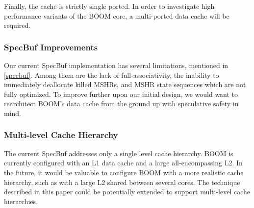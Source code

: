 Finally, the cache is strictly single ported. In order to investigate high performance variants
of the BOOM core, a multi-ported data cache will be required.

\subsubsection{SpecBuf Improvements}
Our current SpecBuf implementation has several limitations, mentioned in \ref{specbuf}.
Among them are the lack of full-associativity, the inability to immediately deallocate killed MSHRs,
and MSHR state sequences which are not fully optimized.
To improve further upon our initial design, we would want to rearchitect BOOM's data cache from
the ground up with speculative safety in mind. 

\subsubsection{Multi-level Cache Hierarchy}
The current SpecBuf addresses only a single level cache hierarchy.
BOOM is currently configured with an L1 data cache and a large all-encompassing L2.
In the future, it would be valuable to configure BOOM with a more realistic cache hierarchy,
such as with a large L2 shared between several cores. The technique described in this paper
could be potentially extended to support multi-level cache hierarchies.
